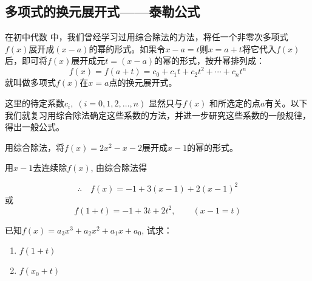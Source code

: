 \subsection{多项式的换元展开式——泰勒公式}

 在初中代数
中，我们曾经学习过用综合除法的方法，将任一个非零次多项式$f(x)$展开成$(x-a)$的幂的形式。如果令$x-a=t$则$x=a+t$将它代入$f(x)$后，即可将$f(x)$展开成元$t=(x-a)$的幂的形式，按升幂排列成：
\[f (x) =f (a+t) =c_0+c_1t+c_2t^2+\cdots+c_nt^n\]
就叫做多项式$f(x)$在$x=a$点的换元展开式。

这里的待定系数$c_i,\; (i=0, 1, 2,\ldots,n)$ 显然只与$f(x)$
和所选定的点$a$有关。以下我们就复习用综合除法确定这些系数的方法，并进一步研究这些系数的一般规律，得出一般公式。

    \begin{example}
        用综合除法，将$f (x) =2x^2-x-2$展开成$x-1$的幂的形式。
    \end{example}    
    
    \begin{solution}
  用$x-1$去连续除$f(x)$, 由综合除法得
\begin{center}
\end{center}

\[\therefore\quad f (x) =-1+3 (x-1) +2 (x-1)^2\]
或
\[f (1+t) =-1+3t+2t^2,\qquad (x-1=t)\]
\end{solution}
   
\begin{example}
已知$f(x)=a_3x^3+a_2x^2+a_1x+a_0$, 试求：
\begin{multicols}{2}
\begin{enumerate}
    \item $f (1+t)$
    \item $f(x_0+t)$
\end{enumerate}
\end{multicols}
\end{example}

